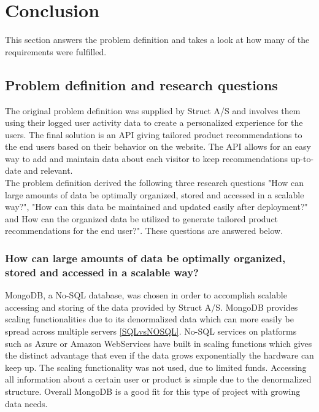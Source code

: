 
\chapter{Conclusion} %

\label{Chapter8} %


This section answers the problem definition and takes a look at how many of the requirements were fulfilled.

\section{Problem definition and research questions}

The original problem definition was supplied by Struct A/S and involves them using their logged user activity data to create a personalized experience for the users. The final solution is an API giving tailored product recommendations to the end users based on their behavior on the website. The API allows for an easy way to add and maintain data about each visitor to keep recommendations up-to-date and relevant. \\
The problem definition derived the following three research questions "How can large amounts of data be optimally organized, stored and accessed in a scalable way?",  "How can this data be maintained and updated easily after deployment?" and How can the organized data be utilized to generate tailored product recommendations for the end user?". These questions are answered below.

\subsection{How can large amounts of data be optimally organized, stored and accessed in a scalable way?}
MongoDB, a No-SQL database, was chosen in order to accomplish scalable accessing and storing of the data provided by Struct A/S. MongoDB provides scaling functionalities due to its denormalized data which can more easily be spread across multiple servers \ref{SQLvsNOSQL}. No-SQL services on platforms such as Azure or Amazon WebServices have built in scaling functions \cite{azureNoSQL} which gives the distinct advantage that even if the data grows exponentially the hardware can keep up. The scaling functionality was not used, due to limited funds. Accessing all information about a certain user or product is simple due to the denormalized structure. Overall MongoDB is a good fit for this type of project with growing data needs.

